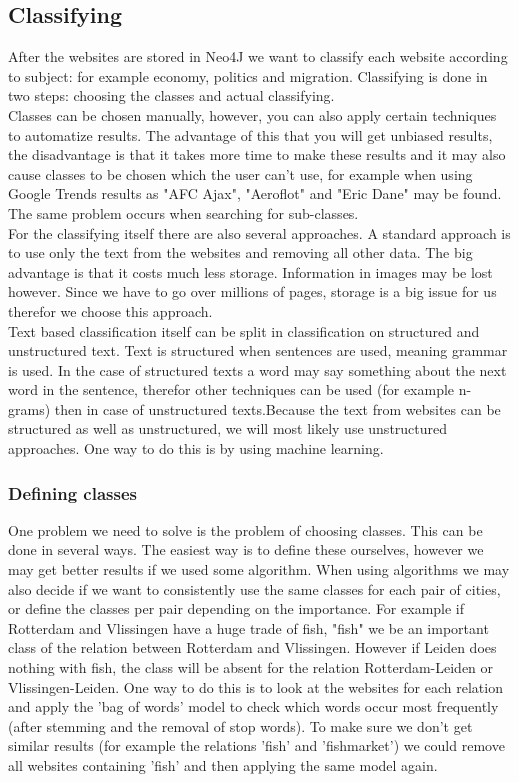 \subsection{Classifying}
After the websites are stored in Neo4J we want to classify each website according to subject: for example economy, politics and migration. Classifying is done in two steps: choosing the classes and actual classifying. \\
Classes can be chosen manually, however, you can also apply certain techniques to automatize results. The advantage of this that you will get unbiased results, the disadvantage is that it takes more time to make these results and it may also cause classes to be chosen which the user can't use, for example when using Google Trends  \cite{googleTrends}  results as "AFC Ajax", "Aeroflot" and "Eric Dane" may be found. The same problem occurs when searching for sub-classes. \\
For the classifying itself there are also several approaches. A standard approach is to use only the text from the websites and removing all other data. The big advantage is that it costs much less storage. Information in images may be lost however. Since we have to go over millions of pages, storage is a big issue for us therefor we choose this approach. \\
Text based classification itself can be split in classification on structured and unstructured text. Text is structured when sentences are used, meaning grammar is used. In the case of structured texts a word may say something about the next word in the sentence, therefor other techniques can be used (for example n-grams) then in case of unstructured texts.Because the text from websites can be structured as well as unstructured, we will most likely use unstructured approaches. One way to do this is by using machine learning.

\subsubsection{Defining classes}
One problem we need to solve is the problem of choosing classes. This can be done in several ways. The easiest way is to define these ourselves, however we may get better results if we used some algorithm. When using algorithms we may also decide if we want to consistently use the same classes for each pair of cities, or define the classes per pair depending on the importance. For example if Rotterdam and Vlissingen have a huge trade of fish, "fish" we be an important class of the relation between Rotterdam and Vlissingen. However if Leiden does nothing with fish, the class will be absent for the relation Rotterdam-Leiden or Vlissingen-Leiden. One way to do this is to look at the websites for each relation and apply the 'bag of words' model to check which words occur most frequently (after stemming and the removal of stop words). To make sure we don't get similar results (for example the relations 'fish' and 'fishmarket') we could remove all websites containing 'fish' and then applying the same model again.

